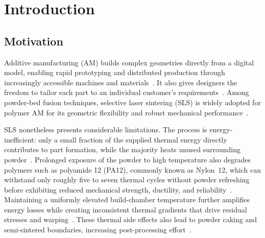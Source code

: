 \chapter{Introduction}
\label{ch:intro}


\section{Motivation}
\label{sec:intro_motivation}

Additive manufacturing (AM) builds complex geometries directly from a digital model, enabling
rapid prototyping and distributed production through increasingly accessible
machines and materials~\cite{gibson2015additive,Beaman2020AdditiveMR,Yang2015AdditiveMD,yao2016cost,debroy2018additive,bahruni2018technology}.
It also gives designers the freedom to tailor each part to an individual
customer's requirements~\cite{ko2015design}.
Among powder-bed fusion techniques, selective laser sintering (SLS)
is widely adopted for polymer AM for its geometric flexibility and robust
mechanical performance~\cite{deckard1989method,jabri2023comprehensive,lupone2021process}.

SLS nonetheless presents considerable limitations. The process is
energy-inefficient: only a small fraction of the supplied thermal energy
directly contributes to part formation, while the majority heats unused
surrounding powder~\cite{jabri2023comprehensive,peyre2015sls,lupone2021process}.
Prolonged exposure of the powder to high temperature also degrades polymers such
as polyamide 12 (PA12), commonly known as Nylon~12, which can withstand only roughly
five to seven thermal cycles without powder refreshing before exhibiting reduced
mechanical strength, ductility, and
reliability~\cite{verbelen2016characterization,zhao2018crystallization,pham2008deterioration,choren2001sls,gornet2002characterization,zarringhalam2006effects}.
Maintaining a uniformly elevated build-chamber temperature further amplifies
energy losses while creating inconsistent thermal gradients that drive residual
stresses and warping~\cite{bourell2014performance,jabri2023comprehensive}. These
thermal side effects also lead to powder caking and semi-sintered boundaries,
increasing post-processing effort~\cite{xiao2024sls}.

